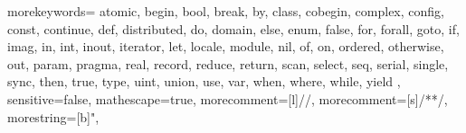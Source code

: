   {
    morekeywords={
      atomic,
      begin, bool, break, by,
      class, cobegin, complex, config, const, continue,
      def, distributed, do, domain,
      else, enum,
      false, for, forall,
      goto,
      if, imag, in, int, inout, iterator,
      let, locale,
      module,
      nil,
      of, on, ordered, otherwise, out,
      param, pragma,
      real, record, reduce, return,
      scan, select, seq, serial, single, sync,
      then, true, type,
      uint, union, use,
      var,
      when, where, while,
      yield
    },
    sensitive=false,
    mathescape=true,
    morecomment=[l]{//},
    morecomment=[s]{/*}{*/},
    morestring=[b]",
}

\lstset{
    basicstyle=\footnotesize\ttfamily,
    keywordstyle=\bfseries,
    commentstyle=\em,
    showstringspaces=false,
    flexiblecolumns=false,
    numbers=left,
    numbersep=5pt,
    numberstyle=\tiny,
    numberblanklines=false,
    stepnumber=0
  }

\newcommand{\chpl}[1]{\lstinline[language=chapel,basicstyle=\normalsize\ttfamily,keywordstyle=]!#1!}

